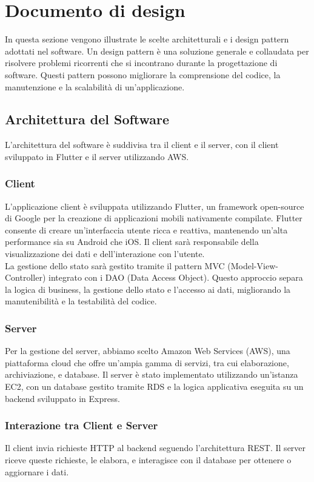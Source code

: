 \chapter{Documento di design}
In questa sezione vengono illustrate le scelte architetturali e i design pattern adottati nel software.
Un design pattern è una soluzione generale e collaudata per risolvere problemi ricorrenti che si incontrano durante la progettazione di software.
Questi pattern possono migliorare la comprensione del codice, la manutenzione e la scalabilità di un'applicazione.

\bigskip\bigskip

\section{Architettura del Software}
L'architettura del software è suddivisa tra il client e il server, con il client sviluppato in Flutter e il server utilizzando AWS.

\subsection{Client}
L'applicazione client è sviluppata utilizzando Flutter, un framework open-source di Google per la creazione di applicazioni mobili nativamente compilate. Flutter consente di creare un'interfaccia utente ricca e reattiva, mantenendo un'alta performance sia su Android che iOS.\meskip
Il client sarà responsabile della visualizzazione dei dati e dell'interazione con l'utente.\\
La gestione dello stato sarà gestito tramite il pattern MVC (Model-View-Controller) integrato con i DAO (Data Access Object).
Questo approccio separa la logica di business, la gestione dello stato e l'accesso ai dati, migliorando la manutenibilità e la testabilità del codice.

\subsection{Server}
Per la gestione del server, abbiamo scelto Amazon Web Services (AWS), una piattaforma cloud che offre un'ampia gamma di servizi, tra cui elaborazione, archiviazione, e database.
Il server è stato implementato utilizzando un'istanza EC2, con un database gestito tramite RDS e la logica applicativa eseguita su un backend sviluppato in Express.


\subsection{Interazione tra Client e Server}
Il client invia richieste HTTP al backend seguendo l'architettura REST. Il server riceve queste richieste, le elabora, e interagisce con il database per ottenere o aggiornare i dati.

